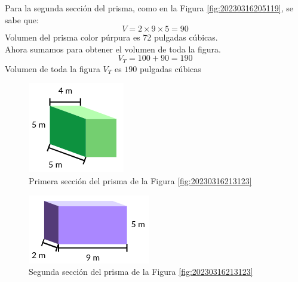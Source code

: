 \begin{solutionbox}{16cm}
\begin{minipage}[t]{.55\textwidth}
        Para la segunda sección del prisma, como en la Figura \ref{fig:20230316205119}, se sabe que:\\
        \[ V = 2\times 9\times 5=90 \]
        Volumen del prisma color púrpura es 72 pulgadas cúbicas.\\
        Ahora sumamos para obtener el volumen de toda la figura.
        \[ V_T = 100+90=190\]
        Volumen de toda la figura $V_T$ es $190$ pulgadas cúbicas
    \end{minipage}
    \begin{multicols}{2}
        \begin{figure}[H]
            \centering
            \includegraphics[width=0.4\linewidth]{../images/20230316213209}
            \caption{Primera sección del prisma de la Figura \ref{fig:20230316213123}}
            \label{fig:20230316213209}
        \end{figure}
        \columnbreak
        \begin{figure}[H]
            \centering
            \includegraphics[width=0.6\linewidth]{../images/20230316213221}
            \caption{Segunda sección del prisma de la Figura \ref{fig:20230316213123}}
            \label{fig:20230316213221}
        \end{figure}
    \end{multicols}
\end{solutionbox}
